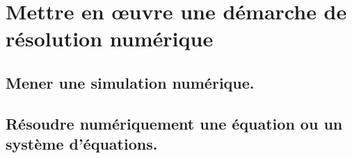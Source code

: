 \documentclass[10pt,fleqn]{book}
\newcommand{\repRel}{../..}
\newcommand{\repStyle}{\repRel/Style}
\newcommand{\td}{fichier_td}
\newcommand{\repExos}{\repRel/ExercicesCompetences}
\newcommand{\repExo}{dossier}
\begin{document}
\renewcommand{\repExo}{\repExos/C2_MettreEnOeuvreDemarche/C2_09_DeterminerLoiMouvement_TEC/18_Maxpid}
\renewcommand{\td}{18_Maxpid}
\graphicspath{{\repStyle/png/}{\repExo/images/}}


\renewcommand{\repExo}{\repExos/C2_MettreEnOeuvreDemarche/C2_09_DeterminerLoiMouvement_TEC/19_Graham}
\renewcommand{\td}{19_Graham}
\graphicspath{{\repStyle/png/}{\repExo/images/}}


\renewcommand{\repExo}{\repExos/C2_MettreEnOeuvreDemarche/C2_09_DeterminerLoiMouvement_TEC/20_VariateurBilles}
\renewcommand{\td}{20_VariateurBilles}
\graphicspath{{\repStyle/png/}{\repExo/images/}}


\renewcommand{\repExo}{\repExos/C2_MettreEnOeuvreDemarche/C2_09_DeterminerLoiMouvement_TEC/49_ElevateurBateaux}
\renewcommand{\td}{49_ElevateurBateaux}
\graphicspath{{\repStyle/png/}{\repExo/images/}}


\renewcommand{\repExo}{\repExos/C2_MettreEnOeuvreDemarche/C2_09_DeterminerLoiMouvement_TEC/50_BancBalafre}
\renewcommand{\td}{50_BancBalafre}
\graphicspath{{\repStyle/png/}{\repExo/images/}}


\renewcommand{\repExo}{\repExos/C2_MettreEnOeuvreDemarche/C2_09_DeterminerLoiMouvement_TEC/64_EPAS}
\renewcommand{\td}{64_EPAS}
\graphicspath{{\repStyle/png/}{\repExo/images/}}


\section{Mettre en œuvre une démarche de résolution numérique} 

\subsection{Mener une simulation numérique. } 

\subsection{Résoudre numériquement une équation ou un système d'équations. } 

\renewcommand{\repExo}{\repExos/C3_ResolutionNumerique/C3_02_Euler/1021_Euler}
\renewcommand{\td}{1021_Euler}
\graphicspath{{\repStyle/png/}{\repExo/images/}}


\renewcommand{\repExo}{\repExos/C3_ResolutionNumerique/C3_02_Euler/1022_Euler}
\renewcommand{\td}{1022_Euler}
\graphicspath{{\repStyle/png/}{\repExo/images/}}

\end{document}
